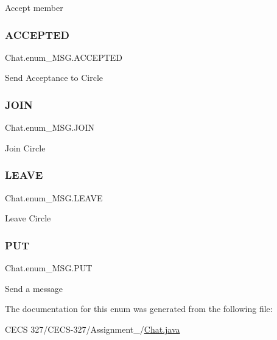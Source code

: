 Accept member \hypertarget{enum_chat_1_1enum___m_s_g_a03d71ee0b5ffa0a67aad84965832d42d}{}\label{enum_chat_1_1enum___m_s_g_a03d71ee0b5ffa0a67aad84965832d42d} 
\subsubsection{\texorpdfstring{A\+C\+C\+E\+P\+T\+ED}{ACCEPTED}}
{\footnotesize\ttfamily Chat.\+enum\+\_\+\+M\+S\+G.\+A\+C\+C\+E\+P\+T\+ED}

Send Acceptance to Circle \hypertarget{enum_chat_1_1enum___m_s_g_a13207b3d66634728aa90ddeaba3c07b2}{}\label{enum_chat_1_1enum___m_s_g_a13207b3d66634728aa90ddeaba3c07b2} 
\subsubsection{\texorpdfstring{J\+O\+IN}{JOIN}}
{\footnotesize\ttfamily Chat.\+enum\+\_\+\+M\+S\+G.\+J\+O\+IN}

Join Circle \hypertarget{enum_chat_1_1enum___m_s_g_ad6d5aef8d11c44afb9c929bcad90dcaa}{}\label{enum_chat_1_1enum___m_s_g_ad6d5aef8d11c44afb9c929bcad90dcaa} 
\subsubsection{\texorpdfstring{L\+E\+A\+VE}{LEAVE}}
{\footnotesize\ttfamily Chat.\+enum\+\_\+\+M\+S\+G.\+L\+E\+A\+VE}

Leave Circle \hypertarget{enum_chat_1_1enum___m_s_g_afe9c3f90691c6e27ce6f063b24c2ba3c}{}\label{enum_chat_1_1enum___m_s_g_afe9c3f90691c6e27ce6f063b24c2ba3c} 
\subsubsection{\texorpdfstring{P\+UT}{PUT}}
{\footnotesize\ttfamily Chat.\+enum\+\_\+\+M\+S\+G.\+P\+UT}

Send a message 

The documentation for this enum was generated from the following file\+:\begin{DoxyCompactItemize}
\item 
C\+E\+C\+S 327/\+C\+E\+C\+S-\/327/\+Assignment\+\_/\hyperlink{_chat_8java}{Chat.\+java}\end{DoxyCompactItemize}
